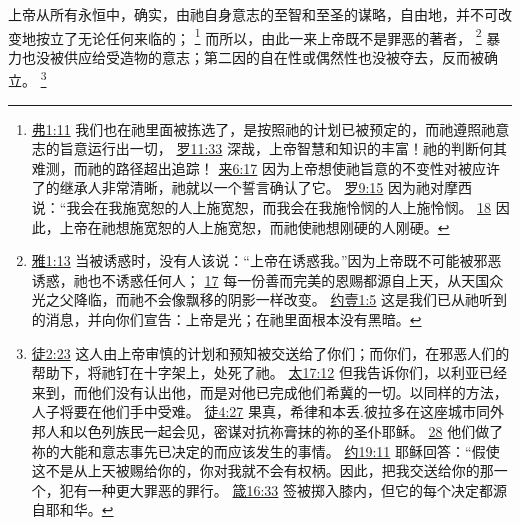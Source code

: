 \documentclass[12pt, a4paper, oneside]{ctexart}
\newcounter{parnum}[section]
\newcommand{\N}{%
   \noindent\refstepcounter{parnum}%
    \makebox[\parindent][l]{\textbf{\arabic{parnum}.}}}
\begin{document}
\N 上帝从所有永恒中，确实，由祂自身意志的至智和至圣的谋略，自由地，并不可改变地按立了无论任何来临的；
	\footnote {
		\href{https://biblehub.com/ephesians/1-11.htm}{弗1:11} 我们也在祂里面被拣选了，是按照祂的计划已被预定的，而祂遵照祂意志的旨意运行出一切，
		\href{https://biblehub.com/romans/11-33.htm}{罗11:33} 深哉，上帝智慧和知识的丰富！祂的判断何其难测，而祂的路径超出追踪！
		\href{https://biblehub.com/hebrews/6-17.htm}{来6:17} 因为上帝想使祂旨意的不变性对被应许了的继承人非常清晰，祂就以一个誓言确认了它。
		\href{https://biblehub.com/romans/9-15.htm}{罗9:15} 因为祂对摩西说：“我会在我施宽恕的人上施宽恕，而我会在我施怜悯的人上施怜悯。
		\href{https://biblehub.com/romans/9-18.htm}{18} 因此，上帝在祂想施宽恕的人上施宽恕，而祂使祂想刚硬的人刚硬。
	}
	而所以，由此一来上帝既不是罪恶的著者，
	\footnote {
		\href{https://biblehub.com/james/1-13.htm}{雅1:13} 当被诱惑时，没有人该说：“上帝在诱惑我。”因为上帝既不可能被邪恶诱惑，祂也不诱惑任何人；
		\href{https://biblehub.com/james/1-17.htm}{17} 每一份善而完美的恩赐都源自上天，从天国众光之父降临，而祂不会像飘移的阴影一样改变。
		\href{https://biblehub.com/1_john/1-5.htm}{约壹1:5} 这是我们已从祂听到的消息，并向你们宣告：上帝是光；在祂里面根本没有黑暗。
	}
	暴力也没被供应给受造物的意志；第二因的自在性或偶然性也没被夺去，反而被确立。
	\footnote {
		\href{https://biblehub.com/acts/2-23.htm}{徒2:23} 这人由上帝审慎的计划和预知被交送给了你们；而你们，在邪恶人们的帮助下，将祂钉在十字架上，处死了祂。
		\href{https://biblehub.com/matthew/17-12.htm}{太17:12} 但我告诉你们，以利亚已经来到，而他们没有认出他，而是对他已完成他们希冀的一切。以同样的方法，人子将要在他们手中受难。
		\href{https://biblehub.com/acts/4-27.htm}{徒4:27} 果真，希律和本丢.彼拉多在这座城市同外邦人和以色列族民一起会见，密谋对抗祢膏抹的祢的圣仆耶稣。
		\href{https://biblehub.com/acts/4-28.htm}{28} 他们做了祢的大能和意志事先已决定的而应该发生的事情。
		\href{https://biblehub.com/john/19-11.htm}{约19:11} 耶稣回答：“假使这不是从上天被赐给你的，你对我就不会有权柄。因此，把我交送给你的那一个，犯有一种更大罪恶的罪行。
		\href{https://biblehub.com/proverbs/16-33.htm}{箴16:33} 签被掷入膝内，但它的每个决定都源自耶和华。
	}
\end{document}
